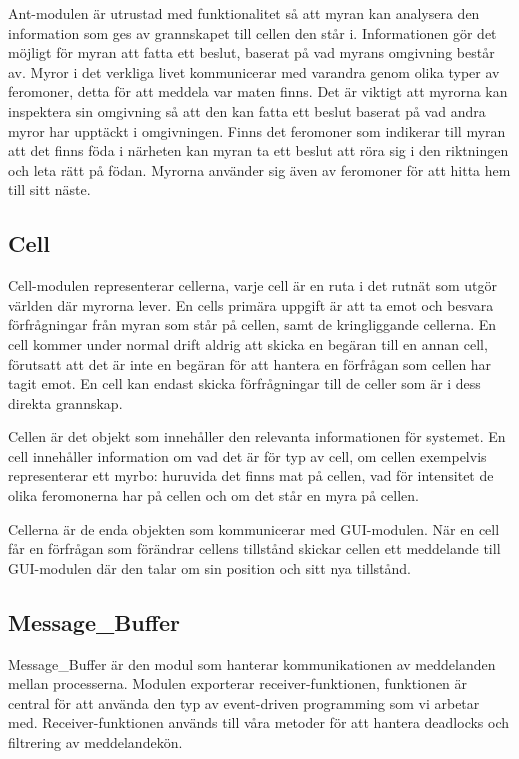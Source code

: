 Ant-modulen är utrustad med funktionalitet så att myran kan analysera den information som ges av grannskapet till cellen den står i. Informationen gör det möjligt för myran att fatta ett beslut, baserat på vad myrans omgivning består av. Myror i det verkliga livet kommunicerar med varandra genom olika typer av feromoner, detta för att meddela var maten finns. Det är viktigt att myrorna kan inspektera sin omgivning så att den kan fatta ett beslut baserat på vad andra myror har upptäckt i omgivningen. Finns det feromoner som indikerar till myran att det finns föda i närheten kan myran ta ett beslut att röra sig i den riktningen och leta rätt på födan. Myrorna använder sig även av feromoner för att hitta hem till sitt näste. 


\subsection{Cell}

Cell-modulen representerar cellerna, varje cell är en ruta i det rutnät som utgör världen där myrorna lever. En cells primära uppgift är att ta emot och besvara förfrågningar från myran som står på cellen, samt de kringliggande cellerna. En cell kommer under normal drift aldrig att skicka en begäran till en annan cell, förutsatt att det är inte en begäran för att hantera en förfrågan som cellen har tagit emot. En cell kan endast skicka förfrågningar till de celler som är i dess direkta grannskap.

Cellen är det objekt som innehåller den relevanta informationen för systemet. En cell innehåller information om vad det är för typ av cell, om cellen exempelvis representerar ett myrbo: huruvida det finns mat på cellen, vad för intensitet de olika feromonerna har på cellen och om det står en myra på cellen.

Cellerna är de enda objekten som kommunicerar med GUI-modulen. När en cell får en förfrågan som förändrar cellens tillstånd skickar cellen ett meddelande till GUI-modulen där den talar om sin position och sitt nya tillstånd. 

\subsection{Message\_Buffer}

Message\_Buffer är den modul som hanterar kommunikationen av meddelanden mellan processerna. Modulen exporterar receiver-funktionen, funktionen är central för att använda den typ av event-driven programming som vi arbetar med. Receiver-funktionen används till våra metoder för att hantera deadlocks och filtrering av meddelandekön.


